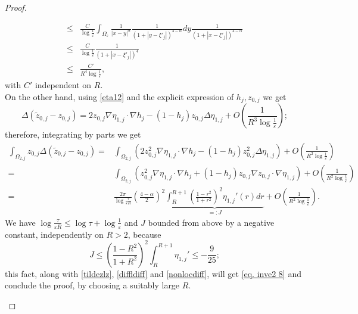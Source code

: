 \documentclass[11pt]{article}
\begin{document}
\begin{proof}
\begin{itemize}
\begin{align}
\nonumber\le&\frac C{\log\frac1\varepsilon}\int_{\Omega_\varepsilon}\frac1{|x-y|^\alpha}\frac1{\left(1+\left|y-\xi'_j\right|\right)^{4-\alpha}}dy\frac1{\left(1+\left|x-\xi'_j\right|\right)^{4-\alpha}}\\
\nonumber\le&\frac C{\log\frac1\varepsilon}\frac1{\left(1+\left|x-\xi'_j\right|\right)^4}\\
\label{nonlocdiff}\le&\frac{C'}{R^4\log\frac1\varepsilon},
\end{align}
with $C'$ independent on $R$.\\
On the other hand, using \eqref{eta12} and the explicit expression of $h_j,z_{0,j}$ we get
$$\Delta(\widetilde z_{0,j}-z_{0,j})=2z_{0,j}\nabla\eta_{1,j}\cdot\nabla h_j-(1-h_j)z_{0,j}\Delta\eta_{1,j}+O\left(\frac1{R^3\log\frac1\varepsilon}\right);$$
therefore, integrating by parts we get
\begin{align*}
\int_{\Omega_{2,j}}z_{0,j}\Delta(\widetilde z_{0,j}-z_{0,j})=&\int_{\Omega_{2,j}}\left(2z_{0,j}^2\nabla\eta_{1,j}\cdot\nabla h_j-(1-h_j)z_{0,j}^2\Delta\eta_{1,j}\right)+O\left(\frac1{R^2\log\frac1\varepsilon}\right)\\
=&\int_{\Omega_{2,j}}\left(z_{0,j}^2\nabla\eta_{1,j}\cdot\nabla h_j+(1-h_j)z_{0,j}\nabla z_{0,j}\cdot\nabla\eta_{1,j}\right)+O\left(\frac1{R^2\log\frac1\varepsilon}\right)\\
=&\frac{2\pi}{\log\frac\tau{\varepsilon R}}\left(\frac{4-\alpha}2\right)^2\underbrace{\int_R^{R+1}\left(\frac{1-r^2}{1+r^2}\right)^2\eta_{1,j}'(r)dr}_{=:J}+O\left(\frac1{R^2\log\frac1\varepsilon}\right).
\end{align*}
We have $\log\frac\tau{\varepsilon R}\le\log\tau+\log\frac1\varepsilon$ and $J$ bounded from above by a negative constant, independently on $R>2$, because
$$J\le\left(\frac{1-R^2}{1+R^2}\right)^2\int_R^{R+1}\eta_{1,j}'\le-\frac9{25};$$
this fact, along with \eqref{tildezlz}, \eqref{diffldiff} and \eqref{nonlocdiff}, will get \eqref{eq. inve2 8} and conclude the proof, by choosing a suitably large $R$.
\end{itemize}
\end{proof}\
\end{document}
